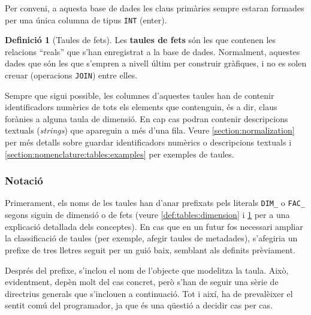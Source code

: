\documentclass{article}
\theoremstyle{definition}
\newtheorem{definition}{Definició}
\begin{document}
Per conveni, a aquesta base de dades les claus primàries sempre estaran formades per una única columna de tipus \verb|INT| (enter). 

\begin{definition}[Taules de fets]\label{def:tables:facts}
  Les \textbf{taules de fets} són les que contenen les relacions ``reals'' que s'han enregistrat a la base de dades. Normalment, aquestes dades que són les que s'empren a nivell últim per construir gràfiques, i no es solen creuar (operacions \verb|JOIN|) entre elles.
\end{definition}

Sempre que sigui possible, les columnes d'aquestes taules han de contenir identificadors numèrics de tots els elements que contenguin, és a dir, claus forànies a alguna taula de dimensió. En cap cas podran contenir descripcions textuals (\emph{strings}) que apareguin a més d'una fila. Veure \cref{section:normalization} per més detalls sobre guardar identificadors numèrics o descripcions textuals i \cref{section:nomenclature:tables:examples} per exemples de taules.

\subsubsection{Notació}\label{section:nomenclature:tables:notation}
Primerament, els noms de les taules han d'anar prefixats pels literals \verb|DIM_| o \verb|FAC_| segons siguin de dimensió o de fets (veure \cref{def:tables:dimension} i \cref{def:tables:facts} per a una explicació detallada dels conceptes). En cas que en un futur fos necessari ampliar la classificació de taules (per exemple, afegir taules de metadades), s'afegiria un prefixe de tres lletres seguit per un guió baix, semblant als definits prèviament.

Després del prefixe, s'inclou el nom de l'objecte que modelitza la taula. Això, evidentment, depèn molt del cas concret, però s'han de seguir una sèrie de directrius generals que s'inclouen a continuació. Tot i així, ha de prevalèixer el sentit comú del programador, ja que és una qüestió a decidir cas per cas.
\end{document}
